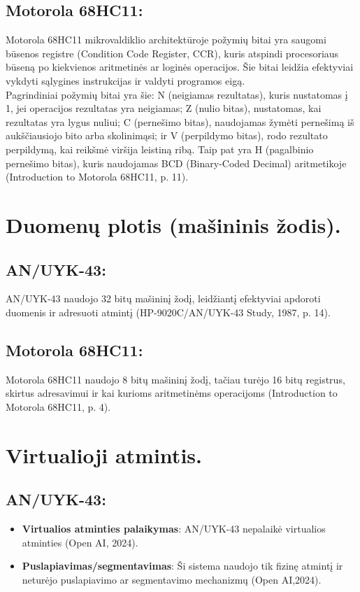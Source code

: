 \documentclass[a4paper,12pt]{article}
\begin{document}
\subsection{Motorola 68HC11:}
Motorola 68HC11 mikrovaldiklio architektūroje požymių bitai yra saugomi būsenos registre (Condition Code Register, CCR), kuris atspindi procesoriaus būseną po kiekvienos aritmetinės ar loginės operacijos. Šie bitai leidžia efektyviai vykdyti sąlygines instrukcijas ir valdyti programos eigą.\\
Pagrindiniai požymių bitai yra šie: N (neigiamas rezultatas), kuris nustatomas į 1, jei operacijos rezultatas yra neigiamas; Z (nulio bitas), nustatomas, kai rezultatas yra lygus nuliui; C (pernešimo bitas), naudojamas žymėti pernešimą iš aukščiausiojo bito arba skolinimąsi; ir V (perpildymo bitas), rodo rezultato perpildymą, kai reikšmė viršija leistiną ribą. Taip pat yra H (pagalbinio pernešimo bitas), kuris naudojamas BCD (Binary-Coded Decimal) aritmetikoje (Introduction to Motorola 68HC11, p. 11).

\section{Duomenų plotis (mašininis žodis).}
\subsection{AN/UYK-43:}
AN/UYK-43 naudojo 32 bitų mašininį žodį, leidžiantį efektyviai apdoroti duomenis ir adresuoti atmintį (HP-9020C/AN/UYK-43 Study, 1987, p. 14).
\subsection{Motorola 68HC11:}
Motorola 68HC11 naudojo 8 bitų mašininį žodį, tačiau turėjo 16 bitų registrus, skirtus adresavimui ir kai kurioms aritmetinėms operacijoms (Introduction to Motorola 68HC11, p. 4).

\section{Virtualioji atmintis.}
\subsection{AN/UYK-43:}
\begin{itemize}
    \item \textbf{Virtualios atminties palaikymas}: AN/UYK-43 nepalaikė virtualios atminties (Open AI, 2024).
    \item \textbf{Puslapiavimas/segmentavimas}: Ši sistema naudojo tik fizinę atmintį ir neturėjo puslapiavimo ar segmentavimo mechanizmų (Open AI,2024).
\end{itemize}
\end{document}
